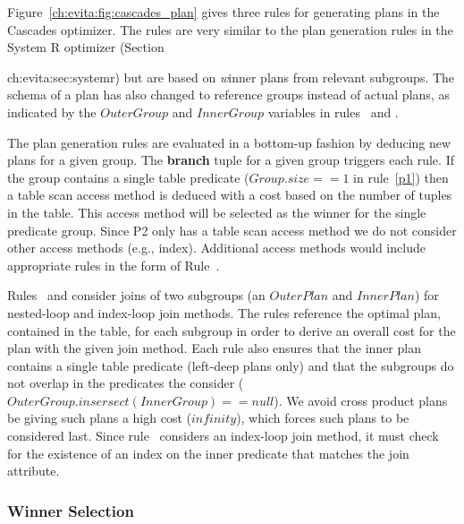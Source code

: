 Figure~\ref{ch:evita:fig:cascades_plan} gives three rules for generating plans in the
Cascades optimizer. The rules are very similar to the plan generation rules in the
System R optimizer (Section{ch:evita:sec:systemr) but are based on {\emph winner} plans
from relevant subgroups. The schema of a plan has also changed to reference groups instead
of actual plans, as indicated by the $OuterGroup$ and $InnerGroup$ variables in rules~
and . 

The plan generation rules are evaluated in a bottom-up fashion by deducing new
plans for a given group.  The {\bf branch} tuple for a given group triggers
each rule.  If the group contains a single table predicate ($Group.size == 1$
in rule~\ref{p1}) then a table scan access method is deduced with a cost based
on the number of tuples in the table.  This access method will be selected as
the winner for the single predicate group. Since P2 only has a table scan
access method we do not consider other access methods (e.g., index). Additional access methods would 
include appropriate rules in the form of Rule~.

Rules~ and  consider joins of two subgroups (an $OuterPlan$ and
$InnerPlan$) for nested-loop and index-loop join methods.  The rules reference
the optimal plan, contained in the  table, for each subgroup in
order to derive an overall cost for the plan with the given join method.  Each
rule also ensures that the inner plan contains a single table predicate
(left-deep plans only) and that the subgroups do not overlap in the predicates
the consider ($OuterGroup.insersect(InnerGroup) == null$). We avoid
cross product plans be giving such plans a high cost ($infinity$), which forces
such plans to be considered last. Since rule~ considers an index-loop join
method, it must check for the existence of an index on the inner predicate that matches
the join attribute. 

\subsubsection{Winner Selection}

}
